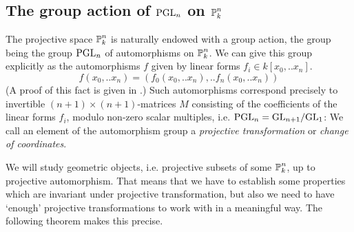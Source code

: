\subsection{The group action of ${\operatorname{PGL}}_n$ on $\operatorname{\mathbb P}^n_k$}

The projective space $\operatorname{\mathbb P}^n_k$ is naturally endowed with a group action, the group being the group ${\operatorname{PGL}}_n$ of automorphisms on $\operatorname{\mathbb P}^n_k$.
We can give this group explicitly as the automorphisms $f$ given by linear forms $f_i \in k[x_0,..x_n]$.
\begin{equation}
f(x_0,..x_n) = (f_0(x_0,..x_n),..f_n(x_0,..x_n))
\end{equation}
(A proof of this fact is given in \cite[example 7.1.1]{hartshorne1977algebraic}.)
Such automorphisms correspond precisely to invertible $(n+1)\times(n+1)$-matrices $M$ consisting of the coefficients of the linear forms $f_i$, modulo non-zero scalar multiples, i.e. ${\operatorname{PGL}}_n = {\operatorname{GL}}_{n+1}/{\operatorname{GL}}_1$:
We call an element of the automorphism group a \emph{projective transformation} or \emph{change of coordinates}.

We will study geometric objects, i.e. projective subsets of some $\operatorname{\mathbb P}^n_k$, up to projective automorphism.
That means that we have to establish some properties which are invariant under projective transformation, but also we need to have `enough' projective transformations to work with in a meaningful way.
The following theorem makes this precise.

